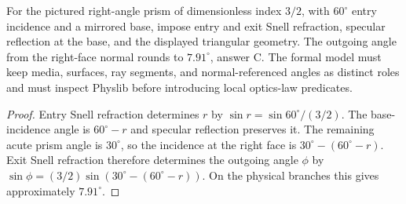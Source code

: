 \begin{theorem}
\label{thm:physics:phyx_mini_0017:target}
For the pictured right-angle prism of dimensionless index $3/2$, with
$60^\circ$ entry incidence and a mirrored base, impose entry and exit Snell
refraction, specular reflection at the base, and the displayed triangular
geometry. The outgoing angle from the right-face normal rounds to
$7.91^\circ$, answer C. The formal model must keep media, surfaces, ray
segments, and normal-referenced angles as distinct roles and must inspect
Physlib before introducing local optics-law predicates.
\end{theorem}
\begin{proof}
Entry Snell refraction determines $r$ by
$\sin r=\sin60^\circ/(3/2)$. The base-incidence angle is $60^\circ-r$ and
specular reflection preserves it. The remaining acute prism angle is
$30^\circ$, so the incidence at the right face is
$30^\circ-(60^\circ-r)$. Exit Snell refraction therefore determines the
outgoing angle $\phi$ by
$\sin\phi=(3/2)\sin(30^\circ-(60^\circ-r))$. On the physical branches this
gives approximately $7.91^\circ$.
\end{proof}


